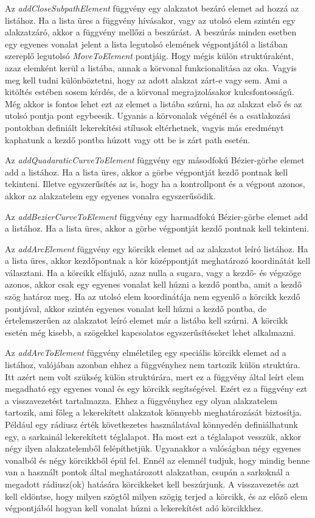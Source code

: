 \documentclass[12pt]{report}
\theoremstyle{definition}
\newcommand{\func}[1]{{\textsl{#1}}}
\begin{document}
Az \func{addCloseSubpathElement} függvény egy alakzatot bezáró elemet ad hozzá
az listához. Ha a lista üres a függvény hívásakor, vagy az utolsó elem szintén
egy alakzatzáró, akkor a függvény mellőzi a beszúrást. A beszúrás minden
esetben egy egyenes vonalat jelent a lista legutolsó elemének végpontjától a
listában szereplő legutolsó \func{MoveToElement} pontjáig. Hogy mégis külön
struktúraként, azaz elemként kerül a listába, annak a körvonal funkcionalitása
az oka. Vagyis meg kell tudni különböztetni, hogy az adott alakzat zárt-e vagy
sem. Ami a kitöltés estében sosem kérdés, de a körvonal megrajzolásakor
kulcsfontosságú. Még akkor is fontos lehet ezt az elemet a listába szúrni, ha
az alakzat első és az utolsó pontja pont egybeesik. Ugyanis a körvonalak
végénél és a csatlakozási pontokban definiált lekerekítési stílusok
eltérhetnek, vagyis más eredményt kaphatunk a kezdő pontba húzott vagy ott be
is zárt path esetén.

Az \func{addQuadaraticCurveToElement} függvény egy másodfokú Bézier-görbe
elemet add a listához. Ha a lista üres, akkor a görbe végpontját kezdő pontnak
kell tekinteni. Illetve egyszerűsítés az is, hogy ha a kontrollpont és a
végpont azonos, akkor az alakzatelem egy egyenes vonalra egyszerűsödik.

Az \func{addBezierCurveToElement} függvény egy harmadfokú Bézier-görbe elemet
add a listához. Ha a lista üres, akkor a görbe végpontját kezdő pontnak kell
tekinteni.

Az \func{addArcElement} függvény egy körcikk elemet ad az alakzatot leíró
listához. Ha a lista üres, akkor kezdőpontnak a kör középpontját meghatározó
koordinátát kell választani. Ha a körcikk elfajuló, azaz nulla a sugara, vagy a
kezdő- és végszöge azonos, akkor csak egy egyenes vonalat kell húzni a kezdő
pontba, amit a kezdő szög határoz meg. Ha az utolsó elem koordinátája nem
egyenlő a körcikk kezdő pontjával, akkor szintén egyenes vonalat kell húzni a
kezdő pontba, de értelemszerűen az alakzatot leíró elemet már a listába kell
szúrni. A körcikk esetén még kisebb, a szögekkel kapcsolatos egyszerűsítéseket
lehet alkalmazni.

Az \func{addArcToElement} függvény elméletileg egy speciális körcikk elemet ad
a listához, valójában azonban ehhez a függvényhez nem tartozik külön struktúra.
Itt azért nem volt szükség külön struktúrára, mert ez a függvény által leírt
elem megadható egy egyenes vonal és egy körcikk segítségével. Ezért ez a
függvény ezt a visszavezetést tartalmazza. Ehhez a függvényhez egy olyan
alakzatelem tartozik, ami főleg a lekerekített alakzatok könnyebb
meghatározását biztosítja. Például egy rádiusz érték következetes használatával
könnyedén definiálhatunk egy, a sarkainál lekerekített téglalapot. Ha most ezt
a téglalapot vesszük, akkor négy ilyen alakzatelemből felépíthetjük. Ugyanakkor
a valóságban négy egyenes vonalból és négy körcikkből épül fel. Ennél az
elemnél tudjuk, hogy mindig benne van a használt pontok által meghatározott
alakzatban, csupán a sarkoknál a megadott rádiusz(ok) hatására körcikkeket kell
beszúrjunk. A visszavezetés azt kell eldöntse, hogy milyen szögtől milyen
szögig terjed a körcikk, és az előző elem végpontjából hogyan kell vonalat
húzni a lekerekítést adó körcikkhez.
\end{document}
